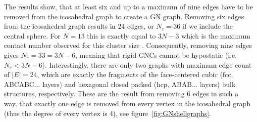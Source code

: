 The results show, that at least six and up to a maximum of nine edges have to
be removed from the icosahedral graph to create a GN graph. Removing six edges
from the icosahedral graph results in 24 edges, or $N_c=36$ if we include the
central sphere. For $N=13$ this is exactly equal to $3N-3$ which is the maximum
contact number observed for this cluster size
\autocite{Hoy_Structuredynamicsmodel_2015,Holmes-Cerfon_EnumeratingRigidSphere_2016}.
Consequently, removing nine edges gives $N_c=33=3N-6$, meaning that rigid GNCs
cannot be hypostatic (i.e. $N_c < 3N-6$). Interestingly, there are only two
graphs with maximum edge count of $|E|=24$, which are exactly the fragments of
the face-centered cubic (fcc, ABCABC... layers) and hexagonal closed packed
(hcp, ABAB... layers) bulk structures, respectively. These are the result from
removing 6 edges in such a way, that exactly one edge is removed from every
vertex in the icosahedral graph (thus the degree of every vertex is 4), see
figure~\ref{fig:GNshellgraphs}.
